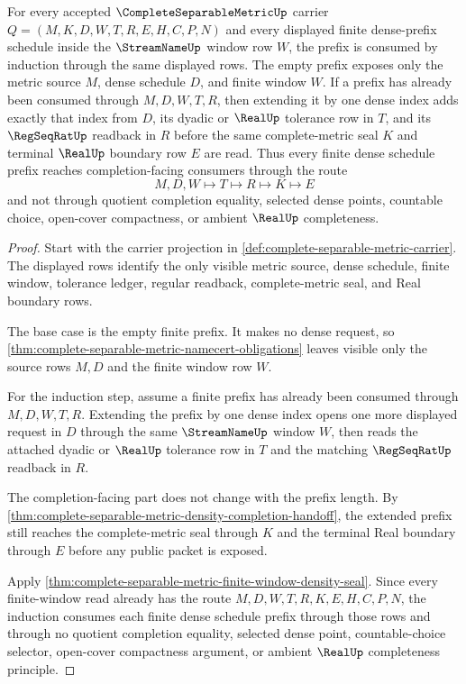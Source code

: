 \begin{theorem}\label{thm:complete-separable-metric-finite-density-induction}
For every accepted $\CompleteSeparableMetricUp$ carrier $Q=(M,K,D,W,T,R,E,H,C,P,N)$ and every displayed finite dense-prefix schedule inside the $\StreamNameUp$ window row $W$, the prefix is consumed by induction through the same displayed rows. The empty prefix exposes only the metric source $M$, dense schedule $D$, and finite window $W$. If a prefix has already been consumed through $M,D,W,T,R$, then extending it by one dense index adds exactly that index from $D$, its dyadic or $\RealUp$ tolerance row in $T$, and its $\RegSeqRatUp$ readback in $R$ before the same complete-metric seal $K$ and terminal $\RealUp$ boundary row $E$ are read. Thus every finite dense schedule prefix reaches completion-facing consumers through the route
$$
M,D,W \longmapsto T \longmapsto R \longmapsto K \longmapsto E
$$
and not through quotient completion equality, selected dense points, countable choice, open-cover compactness, or ambient $\RealUp$ completeness.
\end{theorem}
\begin{proof}
Start with the carrier projection in \autoref{def:complete-separable-metric-carrier}. The displayed rows identify the only visible metric source, dense schedule, finite window, tolerance ledger, regular readback, complete-metric seal, and Real boundary rows.

The base case is the empty finite prefix. It makes no dense request, so \autoref{thm:complete-separable-metric-namecert-obligations} leaves visible only the source rows $M,D$ and the finite window row $W$.

For the induction step, assume a finite prefix has already been consumed through $M,D,W,T,R$. Extending the prefix by one dense index opens one more displayed request in $D$ through the same $\StreamNameUp$ window $W$, then reads the attached dyadic or $\RealUp$ tolerance row in $T$ and the matching $\RegSeqRatUp$ readback in $R$.

The completion-facing part does not change with the prefix length. By \autoref{thm:complete-separable-metric-density-completion-handoff}, the extended prefix still reaches the complete-metric seal through $K$ and the terminal Real boundary through $E$ before any public packet is exposed.

Apply \autoref{thm:complete-separable-metric-finite-window-density-seal}. Since every finite-window read already has the route $M,D,W,T,R,K,E,H,C,P,N$, the induction consumes each finite dense schedule prefix through those rows and through no quotient completion equality, selected dense point, countable-choice selector, open-cover compactness argument, or ambient $\RealUp$ completeness principle.
\end{proof}

